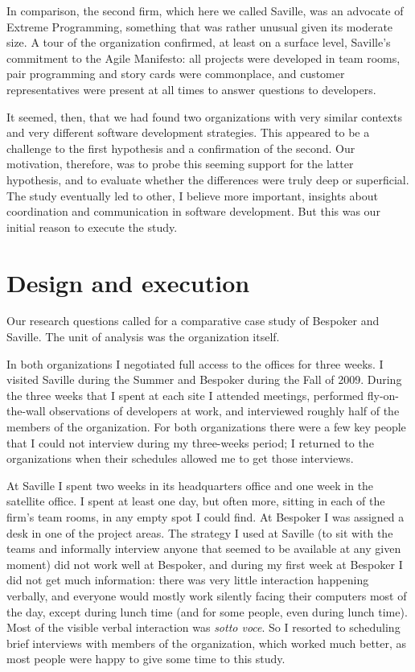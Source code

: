 In comparison, the second firm, which here we called Saville, was an advocate of Extreme Programming, something that was rather unusual given its moderate size. A tour of the organization confirmed, at least on a surface level, Saville's commitment to the Agile Manifesto: all projects were developed in team rooms, pair programming and story cards were commonplace, and customer representatives were present at all times to answer questions to developers.

It seemed, then, that we had found two organizations with very similar contexts and very different software development strategies. This appeared to be a challenge to the first hypothesis and a confirmation of the second. Our motivation, therefore, was to probe this seeming support for the latter hypothesis, and to evaluate whether the differences were truly deep or superficial. The study eventually led to other, I believe more important, insights about coordination and communication in software development. But this was our initial reason to execute the study.



\section{Design and execution}
\label{sec:ContrastDesign}

Our research questions called for a comparative case study of Bespoker and Saville. The unit of analysis was the organization itself.

In both organizations I negotiated full access to the offices for three weeks. I visited Saville during the Summer and Bespoker during the Fall of 2009. During the three weeks that I spent at each site I attended meetings, performed fly-on-the-wall observations of developers at work, and interviewed roughly half of the members of the organization. For both organizations there were a few key people that I could not interview during my three-weeks period; I returned to the organizations when their schedules allowed me to get those interviews.

At Saville I spent two weeks in its headquarters office and one week in the satellite office. I spent at least one day, but often more, sitting in each of the firm's team rooms, in any empty spot I could find. At Bespoker I was assigned a desk in one of the project areas. The strategy I used at Saville (to sit with the teams and informally interview anyone that seemed to be available at any given moment) did not work well at Bespoker, and during my first week at Bespoker I did not get much information: there was very little interaction happening verbally, and everyone would mostly work silently facing their computers most of the day, except during lunch time (and for some people, even during lunch time). Most of the visible verbal interaction was \emph{sotto voce}. So I resorted to scheduling brief interviews with members of the organization, which worked much better, as most people were happy to give some time to this study.

